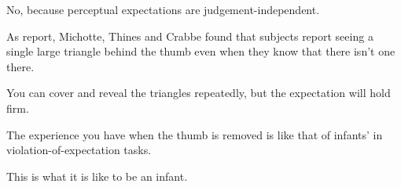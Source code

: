 \documentclass[12pt,\papersize]{extarticle}
\begin{document}
No, because perceptual expectations are judgement-independent.
 
As \citep{kellman:1983_perception} report, Michotte, Thines and Crabbe found that subjects report seeing a single large triangle behind the thumb even when they know that there isn't one there.
 
You can cover and reveal the triangles repeatedly, but the expectation will hold firm.
 
 
 
The experience you have when the thumb is removed is like that of infants' in violation-of-expectation tasks.
 
This is what it is like to be an infant.
 

    

 






\end{document}

